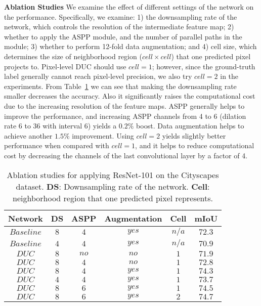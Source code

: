 \documentclass[10pt,twocolumn,letterpaper]{article}
\begin{document}
\textbf{Ablation Studies}
We examine the effect of different settings of the network on the performance. Specifically, we examine: 1) the downsampling rate of the network, which controls the resolution of the intermediate feature map; 2) whether to apply the ASPP module, and the number of parallel paths in the module; 3) whether to perform 12-fold data augmentation; and 4) cell size, which determines the size of neighborhood region ($cell\times cell$) that one predicted pixel projects to. Pixel-level DUC should use  $cell=1$; however, since the ground-truth label generally cannot reach pixel-level precision, we also try $cell=2$ in the experiments. From Table~\ref{table_1} we can see that making the downsampling rate smaller decreases the accuracy. Also it significantly raises the computational cost due to the increasing resolution of the feature maps. ASPP generally helps to improve the performance, and increasing ASPP channels from 4 to 6 (dilation rate 6 to 36 with interval 6) yields a $0.2\%$ boost. Data augmentation helps to achieve another $1.5\%$ improvement. Using $cell=2$ yields slightly better performance when compared with $cell=1$, and it helps to reduce computational cost by decreasing the channels of the last convolutional layer by a factor of 4.

\begin{table}[ht]
\begin{center}
\begin{tabular}{ccccc|c} \toprule[1.5pt]{Network}      &     {DS}   & {ASPP}  &  {Augmentation} & {Cell} &{mIoU}\\ \midrule
   $Baseline$  &     $8$    &  $4$    &  $yes$  & $n/a$ & $72.3$ \\
   $Baseline$  &     $4$    &  $4$    &  $yes$  & $n/a$ & $70.9$ \\ \midrule
   $DUC$  &     	 $8$    &  $no$   &  $no$  &  $1$ & $71.9$ \\
   $DUC$  &    	     $8$    &  $4$    &  $no$  &  $1$ & $72.8$ \\
   $DUC$  &    	     $8$    &  $4$    &  $yes$  & $1$ & $74.3$ \\
   $DUC$  &     	 $4$    &  $4$    &  $yes$  & $1$ & $73.7$ \\
   $DUC$  &     	 $8$    &  $6$    &  $yes$  & $1$ & $74.5$ \\
   $DUC$  &     	 $8$    &  $6$    &  $yes$  & $2$ & $74.7$ \\ \bottomrule[1.5pt]
\end{tabular}
\vspace{3pt}
\caption{Ablation studies for applying ResNet-101 on the Cityscapes dataset. \textbf{DS}: Downsampling rate of the network.  \textbf{Cell}: neighborhood region that one predicted pixel represents.}
\label{table_1}
\end{center}
\vspace{-15pt}
\end{table}
\end{document}
